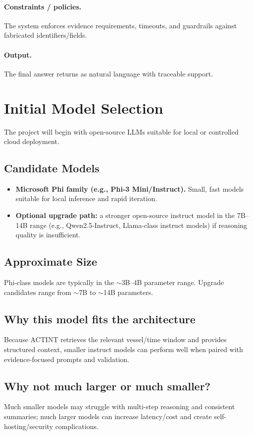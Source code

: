 \documentclass[11pt]{article}
\begin{document}
\paragraph{Constraints / policies.}
The system enforces evidence requirements, timeouts, and guardrails against fabricated identifiers/fields.
\paragraph{Output.}
The final answer returns as natural language with traceable support.


\section{Initial Model Selection}
The project will begin with open-source LLMs suitable for local or controlled cloud deployment.

\subsection*{Candidate Models}
\begin{itemize}
  \item \textbf{Microsoft Phi family (e.g., Phi-3 Mini/Instruct).} Small, fast models suitable for local inference and rapid iteration.
  \item \textbf{Optional upgrade path:} a stronger open-source instruct model in the 7B--14B range (e.g., Qwen2.5-Instruct, Llama-class instruct models) if reasoning quality is insufficient.
\end{itemize}

\subsection*{Approximate Size}
Phi-class models are typically in the $\sim$3B--4B parameter range. Upgrade candidates range from $\sim$7B to $\sim$14B parameters.

\subsection*{Why this model fits the architecture}
Because ACTINT retrieves the relevant vessel/time window and provides structured context, smaller instruct models can perform well when paired with evidence-focused prompts and validation.

\subsection*{Why not much larger or much smaller?}
Much smaller models may struggle with multi-step reasoning and consistent summaries; much larger models can increase latency/cost and create self-hosting/security complications.
\end{document}
